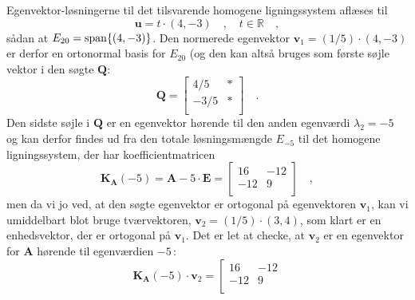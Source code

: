 \begin{example}
Egenvektor-løsningerne til det tilsvarende homogene ligningssystem aflæses til
\begin{equation}
\mathbf{u} = t\cdot(4, -3) \quad , \quad t \in \mathbb{R} \quad ,
 \end{equation}
 sådan at $E_{20}= \mathrm{span}\{(4,-3)\}$. Den normerede egenvektor $\mathbf{v}_{1} = (1/5)\cdot (4, -3)$ er derfor en ortonormal basis for $E_{20}$ (og den kan altså bruges som første søjle vektor i den søgte $\mathbf{Q}$:
\begin{equation}
\mathbf{Q}= \left[
              \begin{array}{rr}
                4/5 & * \\
                -3/5 &  * \\
              \end{array}
            \right]
\quad .
\end{equation}
Den sidste søjle i $\mathbf{Q}$ er en egenvektor hørende til den anden egenværdi $\lambda_{2} = -5$ og kan derfor findes ud fra den totale løsningsmængde $E_{-5}$ til det homogene ligningssystem, der har koefficientmatricen
\begin{equation}
\mathbf{K}_{\mathbf{A}}(-5) = \mathbf{A} - 5\cdot\mathbf{E} = \left[
                                                            \begin{array}{rr}
                                                              16 & -12 \\
                                                              -12 & 9 \\
                                                            \end{array}
                                                          \right]
 \quad ,
\end{equation}
men da vi jo ved, at den søgte egenvektor er ortogonal på egenvektoren $\mathbf{v}_{1}$, kan vi umiddelbart blot bruge tværvektoren, $\mathbf{v}_{2}= (1/5)\cdot(3, 4)$, som klart er en enhedsvektor, der er ortogonal på $\mathbf{v}_{1}$. Det er let at checke, at $\mathbf{v}_{2}$ er en egenvektor for $\mathbf{A}$ hørende til egenværdien $-5$\,:
\begin{equation}
\mathbf{K}_{\mathbf{A}}(-5)\cdot\mathbf{v}_{2} =  \left[
                                                            \begin{array}{rr}
                                                              16 & -12 \\
                                                              -12 & 9 \\

\end{array}
\end{equation}
\end{example}
